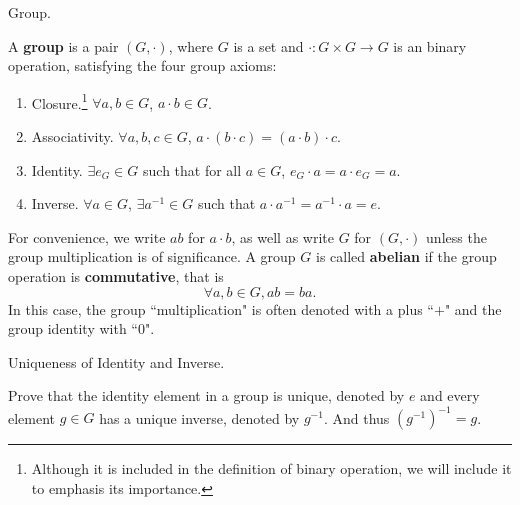 \documentclass[../../book.tex]{subfiles}
\begin{document}
\begin{dfn} Group. 

A \textbf{group} is a pair $(G, \cdot)$, where $G$ is a set and $\cdot : G\times G \rightarrow G$ is an binary operation, satisfying the four group axioms:
\begin{enumerate}
\item Closure.\footnote{Although it is included in the definition of binary operation, we will include it to emphasis its importance.}  $ \forall a,b\in G$, $a\cdot b \in G$.
\item Associativity. $ \forall a,b,c\in G$, $a \cdot (b \cdot c) = (a \cdot b) \cdot c$.
\item Identity. $ \exists e_G \in G$ such that for all $a \in G$, 
$e_G \cdot a = a \cdot e_G=a$.
\item Inverse. $ \forall a\in G$,  $ \exists a^{-1} \in G$ such that $a \cdot a^{-1} = a^{-1} \cdot a = e$.
\end{enumerate}
For convenience, we write $ab$ for $a \cdot b$, 
as well as write $G$ for $(G,\cdot)$ 
unless the group multiplication is of significance. 
A group $G$ is called \textbf{abelian} 
if the group operation is \textbf{commutative}, that is
\[\forall a, b \in G, ab = ba.\]
In this case, the group ``multiplication" is often denoted with a plus ``$+$"
and the group identity with ``$0$".

\end{dfn}


\begin{ex} Uniqueness of Identity and Inverse.

    Prove that the identity element in a group is unique, denoted by $e$ and every element $g \in G$ has a unique inverse, denoted by $g^{-1}$. And thus $(g^{-1})^{-1}=g$.
\end{ex}
\end{document}
